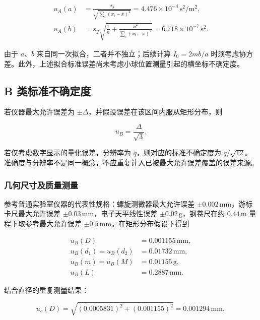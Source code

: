 \documentclass[UTF8]{ctexart}
\begin{document}
\begin{equation}
 \begin{aligned}
 u_A(a)&=\frac{s_y}{\sqrt{\sum_i(x_i-\overline x)^2}}
 =4.476\times10^{-4}\,\mathrm{s^2/m^2},\\
 u_A(b)&=s_y\sqrt{\frac1n+\frac{\overline x^2}{\sum_i(x_i-\overline x)^2}}
 =6.718\times10^{-7}\,\mathrm{s^2}.
 \end{aligned}
\end{equation}

由于 $a$、$b$ 来自同一次拟合，二者并不独立；后续计算 $I_0=2mb/a$ 时须考虑协方差。此外，上述拟合标准误差尚未考虑小球位置测量引起的横坐标不确定度。

\subsection{B 类标准不确定度}

若仪器最大允许误差为 $\pm\Delta$，并假设误差在该区间内服从矩形分布，则

\begin{equation}
 u_B=\frac{\Delta}{\sqrt3}.
\end{equation}

若仅考虑数字显示的量化误差，分辨率为 $q$，则对应的标准不确定度为 $q/\sqrt{12}$。准确度与分辨率不是同一概念，不应重复计入已被最大允许误差覆盖的误差来源。

\subsubsection{几何尺寸及质量测量}

参考普通实验室仪器的代表性规格：螺旋测微器最大允许误差 $\pm0.002\,\mathrm{mm}$，游标卡尺最大允许误差 $\pm0.03\,\mathrm{mm}$，电子天平线性误差 $\pm0.02\,\mathrm{g}$，钢卷尺在约 $0.44\,\mathrm{m}$ 量程下取参考最大允许误差 $\pm0.5\,\mathrm{mm}$。在矩形分布假设下得到

\begin{equation}
 \begin{aligned}
 u_B(D)&=0.001155\,\mathrm{mm},\\
 u_B(d_1)=u_B(d_2)&=0.01732\,\mathrm{mm},\\
 u_B(m)=u_B(M)&=0.01155\,\mathrm{g},\\
 u_B(L)&=0.2887\,\mathrm{mm}.
 \end{aligned}
\end{equation}

结合直径的重复测量结果：

\begin{equation}
 u_c(D)=\sqrt{(0.0005831)^2+(0.001155)^2}
 =0.001294\,\mathrm{mm},
\end{equation}
\end{document}
